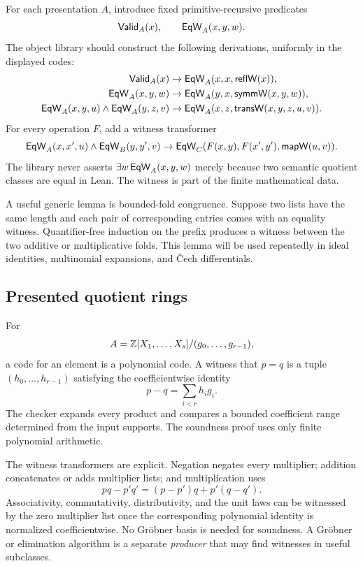 For each presentation $A$, introduce fixed primitive-recursive predicates
\[
        \mathsf{Valid}_A(x),\qquad \mathsf{EqW}_A(x,y,w).
\]
The object library should construct the following derivations, uniformly in the displayed codes:
\begin{align*}
\mathsf{Valid}_A(x)&\to \mathsf{EqW}_A(x,x,\mathsf{reflW}(x)),\\
\mathsf{EqW}_A(x,y,w)&\to \mathsf{EqW}_A(y,x,\mathsf{symmW}(x,y,w)),\\
\mathsf{EqW}_A(x,y,u)\wedge\mathsf{EqW}_A(y,z,v)
 &\to \mathsf{EqW}_A(x,z,\mathsf{transW}(x,y,z,u,v)).
\end{align*}
For every operation $F$, add a witness transformer
\[
   \mathsf{EqW}_A(x,x',u)\wedge\mathsf{EqW}_B(y,y',v)
   \to \mathsf{EqW}_C(F(x,y),F(x',y'),\mathsf{mapW}(u,v)).
\]
The library never asserts $\exists w\,\mathsf{EqW}_A(x,y,w)$ merely because two semantic quotient classes
are equal in Lean.  The witness is part of the finite mathematical data.

A useful generic lemma is bounded-fold congruence.  Suppose two lists have the same length and each
pair of corresponding entries comes with an equality witness.  Quantifier-free induction on the
prefix produces a witness between the two additive or multiplicative folds.  This lemma will be
used repeatedly in ideal identities, multinomial expansions, and \v{C}ech differentials.

\subsection{Presented quotient rings}

For
\[
 A=\mathbb Z[X_1,\ldots,X_s]/(g_0,\ldots,g_{r-1}),
\]
a code for an element is a polynomial code.  A witness that $p=q$ is a tuple
$(h_0,\ldots,h_{r-1})$ satisfying the coefficientwise identity
\[
                     p-q=\sum_{i<r}h_i g_i.
\]
The checker expands every product and compares a bounded coefficient range determined from the
input supports.  The soundness proof uses only finite polynomial arithmetic.

The witness transformers are explicit.  Negation negates every multiplier; addition concatenates
or adds multiplier lists; and multiplication uses
\[
 pq-p'q'=(p-p')q+p'(q-q').
\]
Associativity, commutativity, distributivity, and the unit laws can be witnessed by the zero
multiplier list once the corresponding polynomial identity is normalized coefficientwise.  No
Gr\"obner basis is needed for soundness.  A Gr\"obner or elimination algorithm is a separate
\emph{producer} that may find witnesses in useful subclasses.

